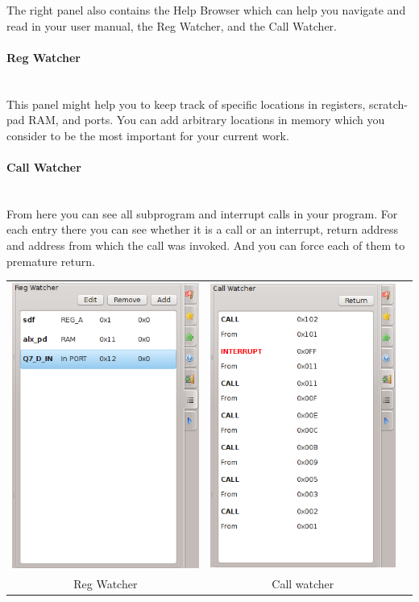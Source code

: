             \clearpage
            The right panel also contains the Help Browser which can help you navigate and read in your user manual, the Reg Watcher, and the Call Watcher.

            \paragraph{Reg Watcher}~\\
                This panel might help you to keep track of specific locations in registers, scratch-pad RAM, and ports. You can add arbitrary locations in memory which you consider to be the most important for your current work.

            \paragraph{Call Watcher}~\\
                From here you can see all subprogram and interrupt calls in your program. For each entry there you can see whether it is a call or an interrupt, return address and address from which the call was invoked. And you can force each of them to premature return.

            \begin{table}[h!]
                \centering
                \begin{tabular}{ccc}
                    \includegraphics[width=.3\textwidth]{img/reg_watcher.png}
                        &
                    \includegraphics[width=.3\textwidth]{img/call_watcher.png}
                    \\ Reg Watcher & Call watcher
                \end{tabular}
            \end{table}

